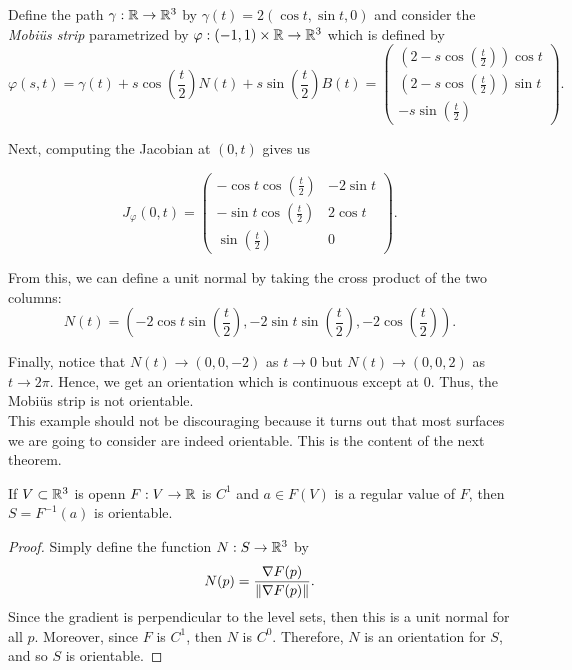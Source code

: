 Define the path $\gamma : \mathbb{R} \to \mathbb{R}^3$ by $\gamma(t) = 2(\cos t, \sin t, 0)$ and consider the \textit{Mobiüs strip} parametrized by $\varphi : (-1,1) \times \mathbb{R} \to \mathbb{R}^3$ which is defined by
$$\varphi(s,t) = \gamma(t) + s\cos\left(\frac{t}{2}\right)N(t) + s\sin\left(\frac{t}{2}\right)B(t) = \begin{pmatrix}
        \left(2 - s\cos \left(\frac{t}{2}\right)\right)\cos t \\ \left(2 - s\cos \left(\frac{t}{2}\right)\right)\sin t \\-s\sin\left(\frac{t}{2}\right)
\end{pmatrix}.$$

Next, computing the Jacobian at $(0,t)$ gives us 

$$J_{\varphi}(0,t) = \begin{pmatrix}
    -\cos t \cos\left(\frac{t}{2}\right) & -2\sin t \\
    -\sin t \cos\left(\frac{t}{2}\right) & 2\cos t \\
    \sin \left(\frac{t}{2}\right) & 0
\end{pmatrix}.$$

From this, we can define a unit normal by taking the cross product of the two columns:
$$N(t) = \left(-2\cos t \sin\left(\frac{t}{2}\right), -2\sin t \sin \left(\frac{t}{2}\right), -2 \cos \left(\frac{t}{2}\right)\right).$$

Finally, notice that $N(t) \rightarrow (0,0,-2)$ as $t \rightarrow 0$ but $N(t) \rightarrow (0,0,2)$ as $t \rightarrow 2\pi$. Hence, we get an orientation which is continuous except at 0. Thus, the Mobiüs strip is not orientable. \\

This example should not be discouraging because it turns out that most surfaces we are going to consider are indeed orientable. This is the content of the next theorem.

\begin{proposition}
    If $V \subset \mathbb{R}^3$ is openn $F : V \to \mathbb{R}$ is $C^1$ and $a \in F(V)$ is a regular value of $F$, then $S = F^{-1}(a)$ is orientable.
\end{proposition}

\begin{proof}
    Simply define the function $N: S \to \mathbb{R}^3$ by
    $$N(p) = \frac{\nabla F(p)}{\left\lVert\nabla F(p) \right\rVert}.$$
    Since the gradient is perpendicular to the level sets, then this is a unit normal for all $p$. Moreover, since $F$ is $C^1$, then $N$ is $C^0$. Therefore, $N$ is an orientation for $S$, and so $S$ is orientable.
\end{proof}
